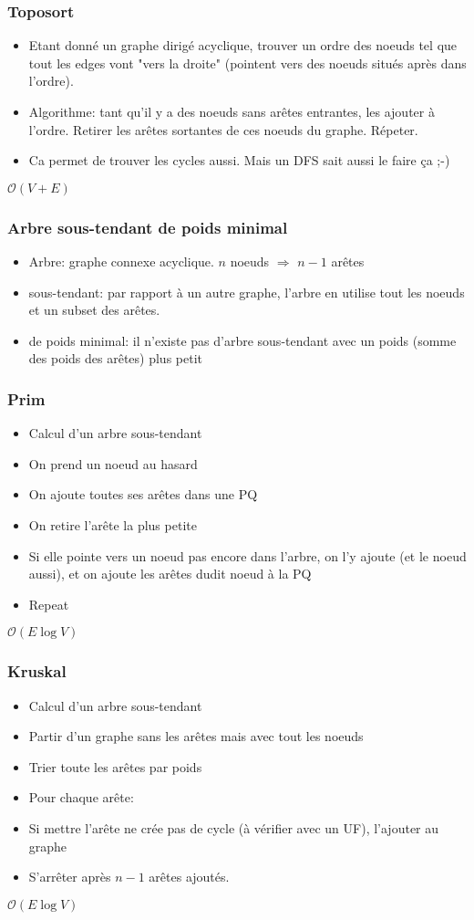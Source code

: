 \documentclass[8pt,aspectratio=169]{beamer}
\begin{document}
\begin{frame}
\frametitle{Toposort}
\begin{itemize}
	\item Etant donné un graphe dirigé acyclique, trouver un ordre des noeuds tel que tout les edges vont "vers la droite" (pointent vers des noeuds situés après dans l'ordre).
	\item Algorithme: tant qu'il y a des noeuds sans arêtes entrantes, les ajouter à l'ordre. Retirer les arêtes sortantes de ces noeuds du graphe. Répeter.
	\item Ca permet de trouver les cycles aussi. Mais un DFS sait aussi le faire ça ;-)
\end{itemize}
$\mathcal{O}(V+E)$
\end{frame}

\begin{frame}
\frametitle{Arbre sous-tendant de poids minimal}
\begin{itemize}
	\item Arbre: graphe connexe acyclique. $n$ noeuds $\Rightarrow$ $n-1$ arêtes
	\item sous-tendant: par rapport à un autre graphe, l'arbre en utilise tout les noeuds et un subset des arêtes.
	\item de poids minimal: il n'existe pas d'arbre sous-tendant avec un poids (somme des poids des arêtes) plus petit
\end{itemize}
\end{frame}

\begin{frame}
\frametitle{Prim}
\begin{itemize}
	\item Calcul d'un arbre sous-tendant
	\item On prend un noeud au hasard
	\item On ajoute toutes ses arêtes dans une PQ
	\item On retire l'arête la plus petite
	\item Si elle pointe vers un noeud pas encore dans l'arbre, on l'y ajoute (et le noeud aussi), et on ajoute les arêtes dudit noeud à la PQ
	\item Repeat
\end{itemize}
$\mathcal{O}(E \log V)$
\end{frame}

\begin{frame}
\frametitle{Kruskal}
\begin{itemize}
	\item Calcul d'un arbre sous-tendant
	\item Partir d'un graphe sans les arêtes mais avec tout les noeuds
	\item Trier toute les arêtes par poids
	\item Pour chaque arête:
	\item Si mettre l'arête ne crée pas de cycle (à vérifier avec un UF), l'ajouter au graphe
	\item S'arrêter après $n-1$ arêtes ajoutés.
\end{itemize}
$\mathcal{O}(E \log V)$
\end{frame}
\end{document}
